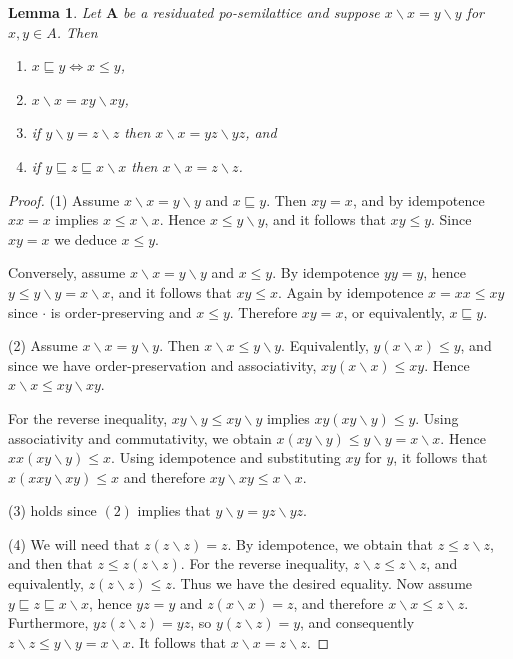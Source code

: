 \documentclass[12pt]{amsart}
\newtheorem{lemma}[theorem]{Lemma}
\newcommand{\m}{\mathbf} %
\newcommand{\ld}{{\backslash}}
\begin{document}
\begin{lemma}\label{xxyy} Let $\m A$ be a residuated po-semilattice and suppose $x\ld x=y\ld y$ for $x,y\in A$. Then
\begin{enumerate}
\item $x\sqsubseteq y\iff x\le y$,
\item $x\ld x=xy\ld xy$,
\item if $y\ld y=z\ld z$ then $x\ld x=yz\ld yz$, and
\item if $y\sqsubseteq z\sqsubseteq x\ld x$ then $x\ld x=z\ld z$.
\end{enumerate}
\end{lemma}
\begin{proof}
(1) Assume $x\ld x=y\ld y$ and $x\sqsubseteq y$. Then $xy=x$, and by idempotence $xx=x$ implies $x\le x\ld x$. Hence $x\le y\ld y$, and it follows that $xy\le y$. Since $xy=x$ we deduce $x\le y$.

Conversely, assume $x\ld x=y\ld y$ and $x\le y$. By idempotence $yy=y$, hence
$y\le y\ld y=x\ld x$, and it follows that $xy\le x$. Again by idempotence $x=xx\le xy$ since $\cdot$ is order-preserving and $x\le y$. Therefore $xy=x$, or equivalently, $x\sqsubseteq y$.

(2) %
Assume $x\ld x = y\ld y$. Then $x\ld x \le y\ld y$. Equivalently, $y(x\ld x) \le y$, and since we have order-preservation and associativity, $xy(x\ld x) \le xy$. Hence $x \ld x \le xy \ld xy$.

For the reverse inequality, $xy\ld y\le xy\ld y$ implies $xy(xy\ld y)\le y$. Using associativity and commutativity, we obtain $x(xy\ld y)\le y\ld y=x\ld x$. Hence $xx(xy\ld y)\le x$. Using idempotence and substituting $xy$ for $y$, it follows that $x(xxy\ld xy)\le x$ and therefore $xy\ld xy\le x\ld x$.

(3) holds since $(2)$ implies that $y\ld y=yz\ld yz$.

(4) We will need that $z(z\ld z) = z$. By idempotence, we obtain that $z \le z\ld z$, and then that $z \le z(z\ld z)$. For the reverse inequality, $z \ld z \le z \ld z$, and equivalently, $z(z\ld z) \le z$. Thus we have the desired equality. Now assume $y\sqsubseteq z\sqsubseteq x\ld x$, hence $yz = y$ and $z(x\ld x) = z$, and therefore $x\ld x \le z\ld z$. Furthermore, $yz(z\ld z) = yz$, so $y(z\ld z) = y$, and consequently $z\ld z \le y\ld y = x\ld x$. It follows that $x\ld x = z\ld z$.
\end{proof}
\end{document}
